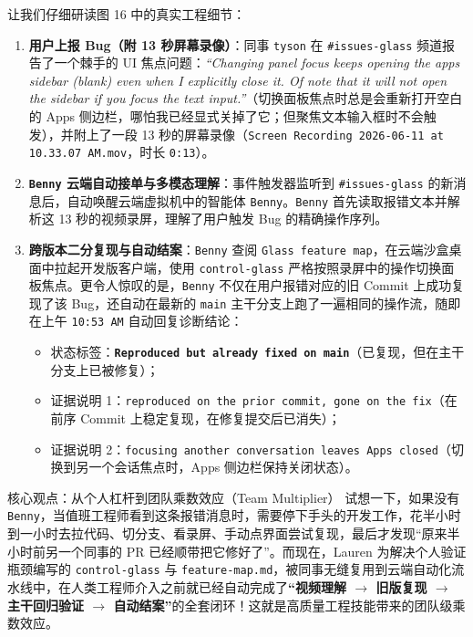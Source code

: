 \documentclass[a4paper]{article}
\begin{document}
让我们仔细研读图 16 中的真实工程细节：
\begin{enumerate}
  \item \textbf{用户上报 Bug（附 13 秒屏幕录像）}：同事 \texttt{tyson} 在 \texttt{\#issues-glass} 频道报告了一个棘手的 UI 焦点问题：\textit{``Changing panel focus keeps opening the apps sidebar (blank) even when I explicitly close it. Of note that it will not open the sidebar if you focus the text input.''}（切换面板焦点时总是会重新打开空白的 Apps 侧边栏，哪怕我已经显式关掉了它；但聚焦文本输入框时不会触发），并附上了一段 13 秒的屏幕录像（\texttt{Screen Recording 2026-06-11 at 10.33.07 AM.mov}，时长 \texttt{0:13}）。
  \item \textbf{\texttt{Benny} 云端自动接单与多模态理解}：事件触发器监听到 \texttt{\#issues-glass} 的新消息后，自动唤醒云端虚拟机中的智能体 \texttt{Benny}。\texttt{Benny} 首先读取报错文本并解析这 13 秒的视频录屏，理解了用户触发 Bug 的精确操作序列。
  \item \textbf{跨版本二分复现与自动结案}：\texttt{Benny} 查阅 \texttt{Glass feature map}，在云端沙盒桌面中拉起开发版客户端，使用 \texttt{control-glass} 严格按照录屏中的操作切换面板焦点。更令人惊叹的是，\texttt{Benny} 不仅在用户报错对应的旧 Commit 上成功复现了该 Bug，还自动在最新的 \texttt{main} 主干分支上跑了一遍相同的操作流，随即在上午 \texttt{10:53 AM} 自动回复诊断结论：
  \begin{itemize}
    \item 状态标签：\textbf{\texttt{Reproduced but already fixed on main}}（已复现，但在主干分支上已被修复）；
    \item 证据说明 1：\texttt{reproduced on the prior commit, gone on the fix}（在前序 Commit 上稳定复现，在修复提交后已消失）；
    \item 证据说明 2：\texttt{focusing another conversation leaves Apps closed}（切换到另一个会话焦点时，Apps 侧边栏保持关闭状态）。
  \end{itemize}
\end{enumerate}

\begin{importantbox}{核心观点：从个人杠杆到团队乘数效应（Team Multiplier）}
试想一下，如果没有 \texttt{Benny}，当值班工程师看到这条报错消息时，需要停下手头的开发工作，花半小时到一小时去拉代码、切分支、看录屏、手动点界面尝试复现，最后才发现“原来半小时前另一个同事的 PR 已经顺带把它修好了”。而现在，Lauren 为解决个人验证瓶颈编写的 \texttt{control-glass} 与 \texttt{feature-map.md}，被同事无缝复用到云端自动化流水线中，在人类工程师介入之前就已经自动完成了\textbf{“视频理解 $\to$ 旧版复现 $\to$ 主干回归验证 $\to$ 自动结案”}的全套闭环！这就是高质量工程技能带来的团队级乘数效应。
\end{importantbox}
\end{document}
